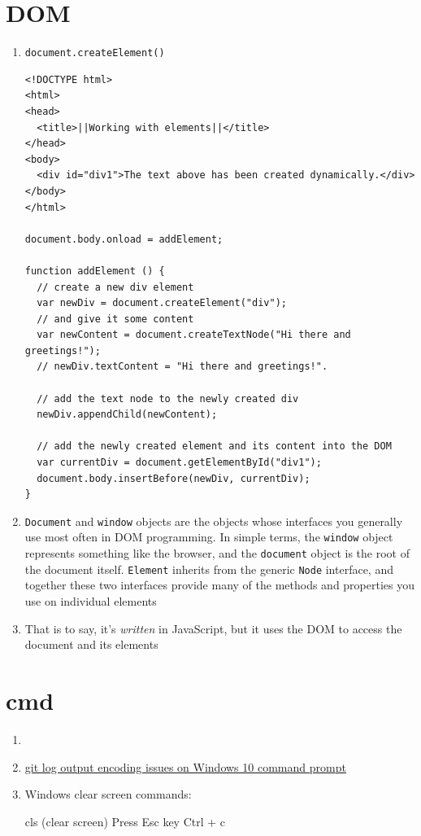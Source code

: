 \documentclass[a4paper, 12pt]{article}
\begin{document}
\section{DOM}
\begin{enumerate}

\item \verb|document.createElement()|
\begin{verbatim}
<!DOCTYPE html>
<html>
<head>
  <title>||Working with elements||</title>
</head>
<body>
  <div id="div1">The text above has been created dynamically.</div>
</body>
</html>

document.body.onload = addElement;

function addElement () { 
  // create a new div element 
  var newDiv = document.createElement("div"); 
  // and give it some content 
  var newContent = document.createTextNode("Hi there and greetings!"); 
  // newDiv.textContent = "Hi there and greetings!".
  
  // add the text node to the newly created div
  newDiv.appendChild(newContent);  

  // add the newly created element and its content into the DOM 
  var currentDiv = document.getElementById("div1"); 
  document.body.insertBefore(newDiv, currentDiv); 
}
\end{verbatim}

\item \verb|Document| and \verb|window| objects are the objects whose interfaces you generally use most often in DOM programming. In simple terms, the \verb|window| object represents something like the browser, and the \verb|document| object is the root of the document itself. \verb|Element| inherits from the generic \verb|Node| interface, and together these two interfaces provide many of the methods and properties you use on individual elements

\item That is to say, it's \textit{written} in JavaScript, but it uses the DOM to access the document and its elements
\end{enumerate}


\section{cmd}
\begin{enumerate}

\item 

\item \href{https://stackoverflow.com/questions/41139067/git-log-output-encoding-issues-on-windows-10-command-prompt}{git log output encoding issues on Windows 10 command prompt}

\item Windows clear screen commands:

cls (clear screen) \quad Press Esc key \quad Ctrl + c

\end{enumerate}
\end{document}
